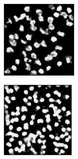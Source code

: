 \begin{figure}[H]
  \begin{subfigure}[b]{0.24\textwidth}
    \centering
    \includegraphics[width=\linewidth]{assets/images/for_presentation/combined-1.png}
  \end{subfigure}\hfill
  \begin{subfigure}[b]{0.24\textwidth}
    \centering
    \includegraphics[width=\linewidth]{assets/images/for_presentation/combined-2.png}

\end{subfigure}
\end{figure}
